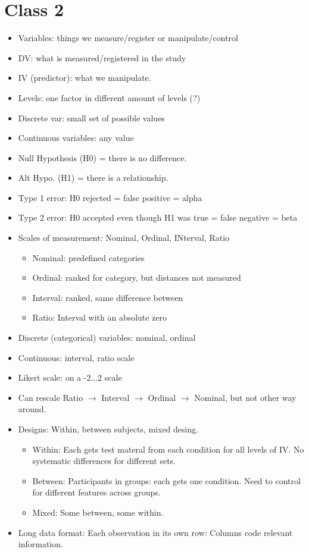 \documentclass[11pt]{article}
\newenvironment{itemise}{
\begin{itemize}
  \setlength{\itemsep}{1pt}
  \setlength{\parskip}{0pt}
  \setlength{\parsep}{0pt}
}{\end{itemize}}
\begin{document}
\section*{Class 2}
\begin{itemise}
\item Variables: things we measure/register or manipulate/control
\item DV: what is measured/registered in the study
\item IV (predictor): what we manipulate. 
\item Levels: one factor in different amount of levels (?)
\item Discrete var: small set of possible values
\item Continuous variables: any value
\item Null Hypothesis (H0) = there is no difference.
\item Alt Hypo. (H1) = there is a relationship.
\item Type 1 error: H0 rejected  = false positive = alpha
\item Type 2 error: H0 accepted even though H1 was true = false negative = beta
\item Scales of measurement: Nominal, Ordinal, INterval, Ratio
\begin{itemise}
\item Nominal: predefined categories
\item Ordinal: ranked for category, but distances not measured
\item Interval: ranked, same difference between
\item Ratio: Interval with an absolute zero
\end{itemise}
\item Discrete (categorical) variables: nominal, ordinal
\item Continuous: interval, ratio scale
\item Likert scale: on a -2...2 scale
\item Can rescale Ratio $\rightarrow$ Interval $\rightarrow$ Ordinal $\rightarrow$ Nominal, but not other way around.
\item Designs: Within, between subjects, mixed desing.
\begin{itemise}
\item Within: Each gets test materal from each condition for all levels of IV. No systematic differences for different sets.
\item Between: Participants in groups: each gets one condition. Need to control for different features across groups.
\item Mixed: Some between, some within. 
\end{itemise}
\item Long data format: Each observation in its own row: Columns code relevant information.
\end{itemise}
\end{document}
